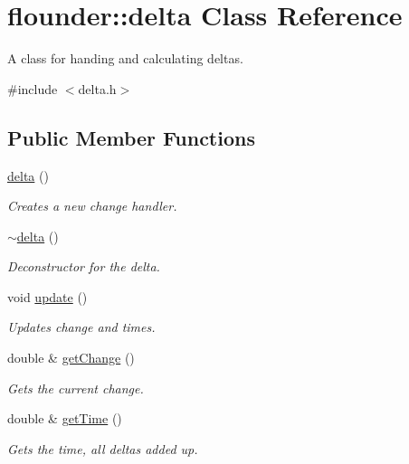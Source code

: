\hypertarget{classflounder_1_1delta}{}\section{flounder\+:\+:delta Class Reference}
\label{classflounder_1_1delta}


A class for handing and calculating deltas.  




{\ttfamily \#include $<$delta.\+h$>$}

\subsection*{Public Member Functions}
\begin{DoxyCompactItemize}
\item 
\hyperlink{classflounder_1_1delta_a6996799d2f9423e994e2beb84dc3ba09}{delta} ()
\begin{DoxyCompactList}\small\item\em Creates a new change handler. \end{DoxyCompactList}\item 
\hyperlink{classflounder_1_1delta_af9eb174b15b3730a45a903e988dac1e8}{$\sim$delta} ()
\begin{DoxyCompactList}\small\item\em Deconstructor for the delta. \end{DoxyCompactList}\item 
void \hyperlink{classflounder_1_1delta_a6f87fd0b76d229ec490a07a565c2afd0}{update} ()
\begin{DoxyCompactList}\small\item\em Updates change and times. \end{DoxyCompactList}\item 
double \& \hyperlink{classflounder_1_1delta_a59d00ad5b5752e6e69f35d7a294c2788}{get\+Change} ()
\begin{DoxyCompactList}\small\item\em Gets the current change. \end{DoxyCompactList}\item 
double \& \hyperlink{classflounder_1_1delta_a86e834ff826cd867bb64099f94195f05}{get\+Time} ()
\begin{DoxyCompactList}\small\item\em Gets the time, all deltas added up. \end{DoxyCompactList}\end{DoxyCompactItemize}
